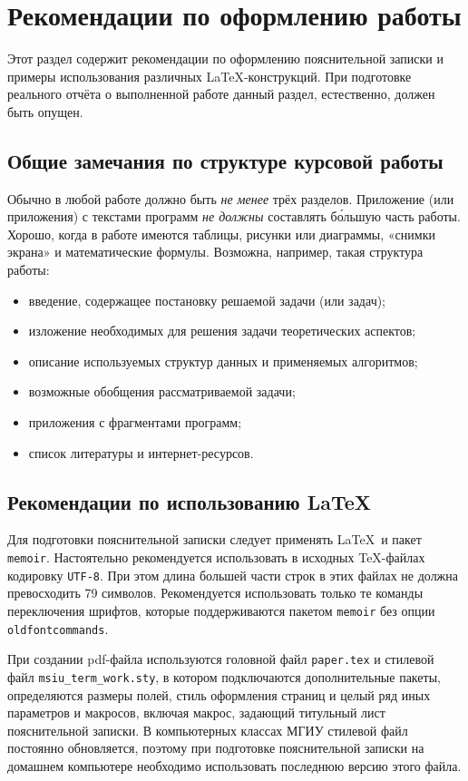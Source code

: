 \section{Рекомендации по оформлению работы}

Этот раздел содержит рекомендации по оформлению пояснительной записки
и примеры использования различных \LaTeX-конструкций. При подготовке
реального отчёта о выполненной работе данный раздел, естественно, должен
быть опущен.

\subsection*{Общие замечания по структуре курсовой работы}

Обычно в любой работе должно быть \emph{не менее} трёх разделов. Приложение
(или приложения) с текстами программ \emph{не должны} составлять б\'{о}льшую
часть работы. Хорошо, когда в работе имеются таблицы, рисунки или диаграммы,
«снимки экрана» и математические формулы. Возможна, например, такая 
структура работы:

\begin{itemize}
\item введение, содержащее постановку решаемой задачи (или задач);
\item изложение необходимых для решения задачи теоретических аспектов;
\item описание используемых структур данных и применяемых алгоритмов;
\item возможные обобщения рассматриваемой задачи;
\item приложения с фрагментами программ;
\item список литературы и интернет-ресурсов.
\end{itemize}

\subsection*{Рекомендации по использованию \LaTeX}

Для подготовки пояснительной записки следует применять \LaTeX\ и пакет 
\texttt{memoir}. Настоятельно рекомендуется использовать в исходных 
\TeX-файлах кодировку \texttt{UTF-8}. При этом длина большей части строк в 
этих файлах не должна превосходить 79 символов. Рекомендуется 
использовать только те команды переключения шрифтов, которые поддерживаются
пакетом \verb|memoir| без опции \verb|oldfontcommands|. 

При создании pdf-файла используются головной файл \texttt{paper.tex} и 
стилевой файл \texttt{msiu\_term\_work.sty}, в котором подключаются 
дополнительные 
пакеты, определяются размеры полей, стиль оформления страниц и целый ряд иных 
параметров и макросов, включая макрос, задающий титульный лист пояснительной
записки. В компьютерных классах МГИУ стилевой файл постоянно обновляется,
поэтому при подготовке пояснительной записки на домашнем компьютере необходимо
использовать последнюю версию этого файла.

